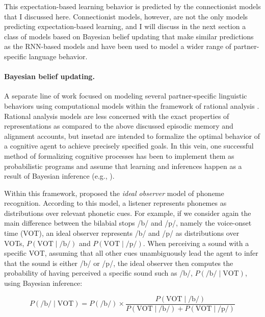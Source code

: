 This expectation-based learning behavior is predicted by the connectionist models that I discussed here. Connectionist models, however, are not the only models predicting expectation-based learning, and I will discuss in the next section a class of models based on Bayesian belief updating that make similar predictions as the RNN-based models and have been used to model a wider range of partner-specific language behavior.

\paragraph{Bayesian belief updating.} A separate line of work focused on modeling several partner-specific linguistic behaviors using computational models within 
the framework of rational analysis \cite{Marr1982,Anderson1990}. Rational analysis models are less concerned with the exact properties of representations as 
compared to the above discussed episodic memory and alignment accounts, but insetad are intended to formalize the optimal behavior of a cognitive agent to achieve 
precisely specified goals. In this vein, one successful method of formalizing cognitive processes has been to implement them as probabilistic programs and assume that learning
and inferences happen as a result of Bayesian inference (e.g., \cite{Tenenbaum2011}). 

Within this framework, \cite{Clayards2008} proposed the \textit{ideal observer} model of phoneme recognition. According to this model, a listener represents phonemes as distributions
over relevant phonetic cues. For example, if we consider again the main difference between the bilabial stops /b/ and /p/, namely the voice-onset time (VOT), an ideal observer represents 
/b/ and /p/ as distributions over VOTs, $P(\mbox{VOT}\mid \mbox{/b/})$ and $P(\mbox{VOT}\mid \mbox{/p/})$. When perceiving a sound with a specific VOT, assuming that all other cues 
unambiguously lead the agent to infer that the sound is either /b/ or /p/, the ideal observer then computes the probability of
having perceived a specific sound such as /b/, $P(\mbox{/b/} \mid \mbox{VOT})$, using Bayesian inference:

$$ P(\mbox{/b/} \mid \mbox{VOT}) = P(\mbox{/b/}) \times \frac{P(\mbox{VOT}\mid \mbox{/b/})}{P(\mbox{VOT}\mid \mbox{/b/}) + P(\mbox{VOT}\mid \mbox{/p/})}   $$

